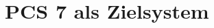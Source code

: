 \begin{comment}
älteste Form Batch Programmierung (Stapelverarbeitungsdatei) wird vom Kommandozeileninterpreter ausgeführt. Meist in der Eingabeaufforderung cmd.exe realisiert und ausgeführt. Nachteil daran: sehr kompliziert und Außerdem im Funktionsumfang nicht mächtig genug für Systemadministration. Entstehende Marktlücke durch fehlendes Durchsetzungsvermögen von kleinen unbekannten Drittanbietern. IN 90er Jahren durch WSH Windows Scripting Host diese Marktlücke geschlossen


windows scripting host

visual basic scripte\\
batch\\
cmd\\
powershell\\
\end{comment}



\chapter{PCS 7 als Zielsystem}
